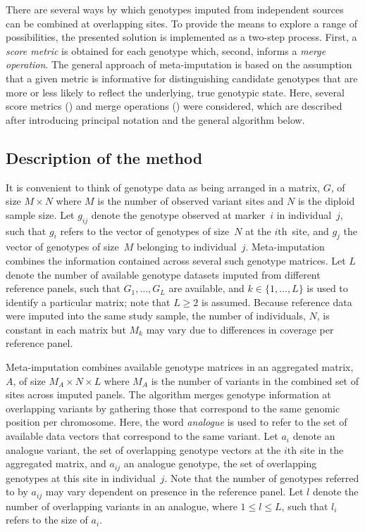 There are several ways by which genotypes imputed from independent sources can be combined at overlapping sites.
To provide the means to explore a range of possibilities, the presented solution is implemented as a two-step process.
First, a \emph{score metric} is obtained for each genotype which, second, informs a \emph{merge operation}.
The general approach of meta-imputation is based on the assumption that a given metric is informative for distinguishing candidate genotypes that are more or less likely to reflect the underlying, true genotypic state.
Here, several score metrics () and  merge operations () were considered, which are described after introducing principal notation and the general algorithm below.


%
\subsection{Description of the method}
%

It is convenient to think of genotype data as being arranged in a matrix, $G$, of size ${M \times N}$ where $M$ is the number of observed variant sites and $N$ is the diploid sample size.
Let $g_{ij}$ denote the genotype observed at marker~$i$ in individual~$j$, such that $g_i$ refers to the vector of genotypes of size~$N$ at the ${i\text{th}}$~site, and $g_j$ the vector of genotypes of size~$M$ belonging to individual~$j$.
Meta-imputation combines the information contained across several such genotype matrices.
Let $L$ denote the number of available genotype datasets imputed from different reference panels, such that ${G_{1}, \dots, G_{L}}$ are available, and ${k \in \{1,\ldots,L\}}$ is used to identify a particular matrix; note that ${L \geq 2}$ is assumed.
Because reference data were imputed into the same study sample, the number of individuals, $N$, is constant in each matrix but $M_k$ may vary due to differences in coverage per reference panel.

%

%

Meta-imputation combines available genotype matrices in an aggregated matrix, $A$, of size ${M_{A} \times N \times L}$ where $M_{A}$ is the number of variants in the combined set of sites across imputed panels.
The algorithm merges genotype information at overlapping variants by gathering those that correspond to the same genomic position per chromosome.
Here, the word \emph{analogue} is used to refer to the set of available data vectors that correspond to the same variant.
Let $a_{i}$ denote an analogue variant, \ie the set of overlapping genotype vectors at the $i\text{th}$ site in the aggregated matrix, and $a_{ij}$ an analogue genotype, \ie the set of  overlapping genotypes at this site in individual~$j$.
Note that the number of genotypes referred to by $a_{ij}$ may vary dependent on presence in the reference panel.
Let $l$ denote the number of overlapping variants in an analogue, where ${1 \leq l \leq L}$, such that $l_i$ refers to the size of $a_i$.

